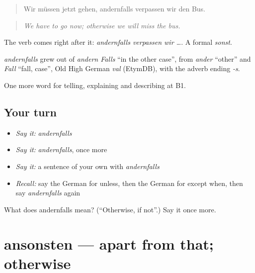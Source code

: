 \begin{quote}
Wir müssen jetzt gehen, andernfalls verpassen wir den Bus.
\end{quote}

\begin{quote}
\emph{We have to go now; otherwise we will miss the bus.}
\end{quote}

The verb comes right after it: \emph{andernfalls verpassen wir …}. A formal \emph{sonst}.

\begin{cousinweb}
\emph{andernfalls} grew out of \emph{andern Falls} \textquotedblleft{}in the other case\textquotedblright{}, from \emph{ander} \textquotedblleft{}other\textquotedblright{} and \emph{Fall} \textquotedblleft{}fall, case\textquotedblright{}, Old High German \emph{val} (EtymDB), with the adverb ending \emph{-s}.
\end{cousinweb}

\begin{grammarlens}[title={What you've built}]
One more word for telling, explaining and describing at B1.
\end{grammarlens}

\subsection*{Your turn}
\begin{itemize}
\raggedright
  \item \emph{Say it:} \emph{andernfalls}
  \item \emph{Say it:} \emph{andernfalls}, once more
  \item \emph{Say it:} a sentence of your own with \emph{andernfalls}
  \item \emph{Recall:} say the German for unless, then the German for except when, then say \emph{andernfalls} again
\end{itemize}

\begin{tcolorbox}[breakable,colback=teal!4,colframe=teal!35!black,title={Before you move on}]
What does andernfalls mean? (\textquotedblleft{}Otherwise, if not\textquotedblright{}.) Say it once more.
\end{tcolorbox}
\section[ansonsten]{ansonsten — apart from that; otherwise}

